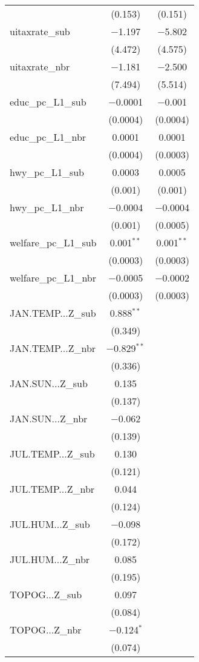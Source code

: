 \begin{table}[!htbp]
\begin{tabular}{@{\extracolsep{5pt}}lcc}
  & (0.153) & (0.151) \\ 
  uitaxrate\_sub & $-$1.197 & $-$5.802 \\ 
  & (4.472) & (4.575) \\ 
  uitaxrate\_nbr & $-$1.181 & $-$2.500 \\ 
  & (7.494) & (5.514) \\ 
  educ\_pc\_L1\_sub & $-$0.0001 & $-$0.001 \\ 
  & (0.0004) & (0.0004) \\ 
  educ\_pc\_L1\_nbr & 0.0001 & 0.0001 \\ 
  & (0.0004) & (0.0003) \\ 
  hwy\_pc\_L1\_sub & 0.0003 & 0.0005 \\ 
  & (0.001) & (0.001) \\ 
  hwy\_pc\_L1\_nbr & $-$0.0004 & $-$0.0004 \\ 
  & (0.001) & (0.0005) \\ 
  welfare\_pc\_L1\_sub & 0.001$^{**}$ & 0.001$^{**}$ \\ 
  & (0.0003) & (0.0003) \\ 
  welfare\_pc\_L1\_nbr & $-$0.0005 & $-$0.0002 \\ 
  & (0.0003) & (0.0003) \\ 
  JAN.TEMP...Z\_sub & 0.888$^{**}$ &  \\ 
  & (0.349) &  \\ 
  JAN.TEMP...Z\_nbr & $-$0.829$^{**}$ &  \\ 
  & (0.336) &  \\ 
  JAN.SUN...Z\_sub & 0.135 &  \\ 
  & (0.137) &  \\ 
  JAN.SUN...Z\_nbr & $-$0.062 &  \\ 
  & (0.139) &  \\ 
  JUL.TEMP...Z\_sub & 0.130 &  \\ 
  & (0.121) &  \\ 
  JUL.TEMP...Z\_nbr & 0.044 &  \\ 
  & (0.124) &  \\ 
  JUL.HUM...Z\_sub & $-$0.098 &  \\ 
  & (0.172) &  \\ 
  JUL.HUM...Z\_nbr & 0.085 &  \\ 
  & (0.195) &  \\ 
  TOPOG...Z\_sub & 0.097 &  \\ 
  & (0.084) &  \\ 
  TOPOG...Z\_nbr & $-$0.124$^{*}$ &  \\ 
  & (0.074) &  \\ 

\end{tabular}
\end{table}
